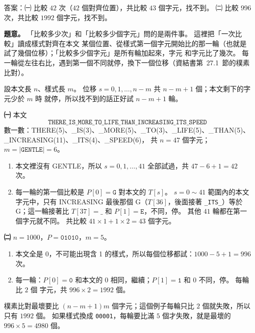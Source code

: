 \begin{pastsoln}
答案：㈠ 比較 $42$ 次（$42$ 個對齊位置），共比較 $43$ 個字元，找不到。 ㈡ 比較 $996$ 次，共比較
$1992$ 個字元，找不到。

\textbf{題意。} 「比較多少次」和「比較多少個字元」問的是兩件事。 這裡把「一次比較」讀成樣式對齊在本文
某個位置、從樣式第一個字元開始比的那一輪（也就是試了幾個位移）；「比較多少個字元」是所有輪加起來，字元
和字元比了幾次。 每一輪從左往右比，遇到第一個不同就停，換下一個位移（資結書第~27.1~節的樸素比對）。

設本文長 $n$、樣式長 $m$。 位移 $s = 0, 1, \ldots, n - m$ 共 $n - m + 1$ 個；本文剩下的字元少於 $m$ 時
就停，所以找不到的話正好試 $n - m + 1$ 輪。

\textbf{㈠} 本文
\[
\texttt{THERE\_IS\_MORE\_TO\_LIFE\_THAN\_INCREASING\_ITS\_SPEED}
\]
數一數：THERE(5)、\_IS(3)、\_MORE(5)、\_TO(3)、\_LIFE(5)、\_THAN(5)、\_INCREASING(11)、\_ITS(4)、\_SPEED(6)，
共 $n = 47$ 個字元；$m = |\texttt{GENTLE}| = 6$。
\begin{enumerate}[label=\arabic*.]
\item 本文裡沒有 GENTLE，所以 $s = 0, 1, \ldots, 41$ 全部試過，共 $47 - 6 + 1 = 42$ 次。
\item 每一輪的第一個比較是 $P[0] = \texttt{G}$ 對本文的 $T[s]$。 $s = 0 \sim 41$ 範圍內的本文字元中，只有
INCREASING 最後那個 G（$T[36]$，後面接著 \texttt{\_ITS\_}）等於 G；這一輪接著比 $T[37] = \texttt{\_}$ 和
$P[1] = \texttt{E}$，不同，停。 其他 $41$ 輪都在第一個字元就不同。 共比較
$41 \times 1 + 1 \times 2 = 43$ 個字元。
\end{enumerate}

\textbf{㈡} $n = 1000$，$P = \texttt{01010}$，$m = 5$。
\begin{enumerate}[label=\arabic*.]
\item 本文全是 0，不可能出現含 1 的樣式，所以每個位移都試：$1000 - 5 + 1 = 996$ 次。
\item 每一輪：$P[0] = \texttt{0}$ 和本文的 0 相同，繼續；$P[1] = \texttt{1}$ 和 0 不同，停。 每輪比 $2$ 個
字元，共 $996 \times 2 = 1992$ 個。
\end{enumerate}
樸素比對最壞要比 $(n - m + 1)m$ 個字元；這個例子每輪只比 $2$ 個就失敗，所以只有 $1992$ 個。 如果樣式換成
\texttt{00001}，每輪要比滿 $5$ 個才失敗，就是最壞的 $996 \times 5 = 4980$ 個。
\end{pastsoln}

